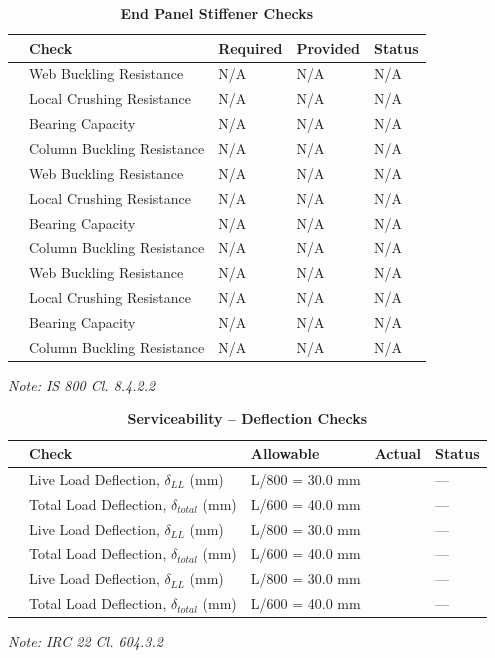\documentclass[12pt,a4paper]{report}
\numberwithin{table}{chapter}
\numberwithin{figure}{chapter}
\begin{document}
\begin{longtable}{|C{2.5cm}|L{3.5cm}|C{3.5cm}|>{\centering\arraybackslash}p{4.2cm}|C{1.8cm}|}
\caption{\textbf{End Panel Stiffener Checks}}
\hline
\textbf{} & \textbf{Check} & \textbf{Required} & \textbf{Provided} & \textbf{Status} \\[6pt]
\hline
{} & Web Buckling Resistance & N/A & N/A & N/A \\[6pt]
 & Local Crushing Resistance & N/A & N/A & N/A \\[6pt]
 & Bearing Capacity & N/A & N/A & N/A \\[6pt]
 & Column Buckling Resistance & N/A & N/A & N/A \\[6pt]
\hline
{} & Web Buckling Resistance & N/A & N/A & N/A \\[6pt]
 & Local Crushing Resistance & N/A & N/A & N/A \\[6pt]
 & Bearing Capacity & N/A & N/A & N/A \\[6pt]
 & Column Buckling Resistance & N/A & N/A & N/A \\[6pt]
\hline
{} & Web Buckling Resistance & N/A & N/A & N/A \\[6pt]
 & Local Crushing Resistance & N/A & N/A & N/A \\[6pt]
 & Bearing Capacity & N/A & N/A & N/A \\[6pt]
 & Column Buckling Resistance & N/A & N/A & N/A \\[6pt]
\hline
\end{longtable}
\noindent\textit{Note: IS 800 Cl. 8.4.2.2}

\vspace{1em}
\begin{longtable}{|C{2.5cm}|L{3.5cm}|C{3.5cm}|>{\centering\arraybackslash}p{3.5cm}|C{2.5cm}|}
\caption{\textbf{Serviceability -- Deflection Checks}}
\hline
\textbf{} & \textbf{Check} & \textbf{Allowable} & \textbf{Actual} & \textbf{Status} \\[6pt]
\hline
{} & Live Load Deflection, $\delta_{LL}$ (mm) & L/800 = 30.0 mm &  & --- \\[6pt]
 & Total Load Deflection, $\delta_{total}$ (mm) & L/600 = 40.0 mm &  & --- \\[6pt]
\hline
{} & Live Load Deflection, $\delta_{LL}$ (mm) & L/800 = 30.0 mm &  & --- \\[6pt]
 & Total Load Deflection, $\delta_{total}$ (mm) & L/600 = 40.0 mm &  & --- \\[6pt]
\hline
{} & Live Load Deflection, $\delta_{LL}$ (mm) & L/800 = 30.0 mm &  & --- \\[6pt]
 & Total Load Deflection, $\delta_{total}$ (mm) & L/600 = 40.0 mm &  & --- \\[6pt]
\hline
\end{longtable}
\noindent\textit{Note: IRC 22 Cl. 604.3.2}
\end{document}

